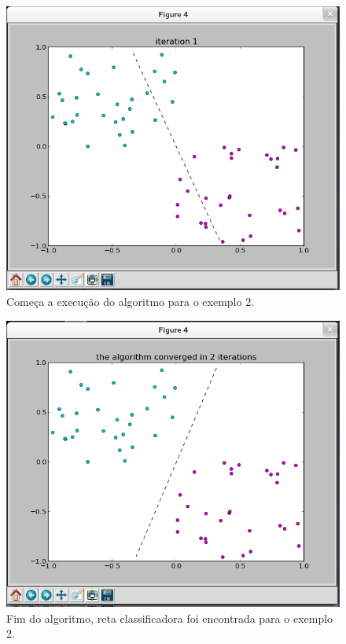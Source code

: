 \documentclass[brazil, a4paper]{article}
\begin{document}
\begin{itemize}
\begin{figure}[!htb]
\centering
\includegraphics[scale=0.25]{ex2-2.png}
\caption{Começa a execução do algoritmo para o exemplo 2.}
\end{figure}

\newpage

\begin{figure}[!htb]
\centering
\includegraphics[scale=0.25]{ex2-3.png}
\caption{Fim do algoritmo, reta classificadora foi encontrada para o exemplo 2.}
\end{figure}


\end{itemize}
\end{document}
